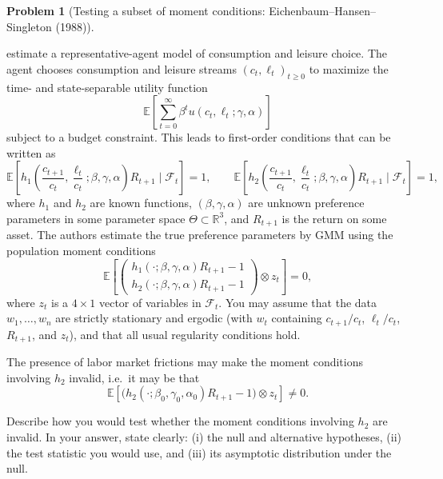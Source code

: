 \documentclass[12pt]{article}
\newcommand{\R}{\mathbb R}
\newcommand{\E}{\mathbb E}
\theoremstyle{definition}
\newtheorem{problem}{Problem}
\theoremstyle{plain}
\begin{document}
\begin{problem}[Testing a subset of moment conditions: Eichenbaum--Hansen--Singleton (1988)]
\label{prob:ehs}

\citet{EichenbaumHansenSingleton1988} estimate a representative-agent model of consumption and leisure choice. The agent chooses consumption and leisure streams $(c_t, \ell_t)_{t \geq 0}$ to maximize the time- and state-separable utility function
\[
\E\left[ \sum_{t=0}^{\infty} \beta^t u(c_t, \ell_t; \gamma, \alpha) \right]
\]
subject to a budget constraint. This leads to first-order conditions that can be written as
\[
\E\left[ h_1\!\left( \frac{c_{t+1}}{c_t}, \frac{\ell_t}{c_t}; \beta, \gamma, \alpha \right) R_{t+1} \mid \mathcal{F}_t \right] = 1, \qquad
\E\left[ h_2\!\left( \frac{c_{t+1}}{c_t}, \frac{\ell_t}{c_t}; \beta, \gamma, \alpha \right) R_{t+1} \mid \mathcal{F}_t \right] = 1,
\]
where $h_1$ and $h_2$ are known functions, $(\beta, \gamma, \alpha)$ are unknown preference parameters in some parameter space $\Theta \subset \R^3$, and $R_{t+1}$ is the return on some asset. The authors estimate the true preference parameters by GMM using the population moment conditions
\[
\E\left[ \begin{pmatrix} h_1(\cdot; \beta, \gamma, \alpha) R_{t+1} - 1 \\ h_2(\cdot; \beta, \gamma, \alpha) R_{t+1} - 1 \end{pmatrix} \otimes z_t \right] = 0,
\]
where $z_t$ is a $4 \times 1$ vector of variables in $\mathcal{F}_t$. You may assume that the data $w_1, \ldots, w_n$ are strictly stationary and ergodic (with $w_t$ containing $c_{t+1}/c_t$, $\ell_t/c_t$, $R_{t+1}$, and $z_t$), and that all usual regularity conditions hold.

The presence of labor market frictions may make the moment conditions involving $h_2$ invalid, i.e.\ it may be that
\[
\E\left[ \bigl( h_2(\cdot; \beta_0, \gamma_0, \alpha_0) R_{t+1} - 1 \bigr) \otimes z_t \right] \neq 0.
\]

Describe how you would test whether the moment conditions involving $h_2$ are invalid. In your answer, state clearly: (i) the null and alternative hypotheses, (ii) the test statistic you would use, and (iii) its asymptotic distribution under the null.
\end{problem}
\end{document}

